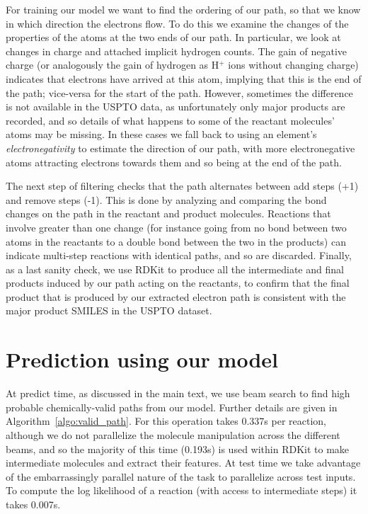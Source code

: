 For training our model we want to find the ordering of our path, so that we know in which direction the electrons flow.
To do this we examine the changes of the properties of the atoms at the two ends of our path. 
In particular, we look at changes in charge and attached implicit hydrogen counts. 
The gain of negative charge (or analogously the gain of hydrogen as H$^+$ ions without changing charge) indicates that electrons have arrived at this atom, 
implying that this is the end of the path; 
vice-versa for the start of the path.
However, sometimes the difference is not available in the USPTO data, as unfortunately only major products are recorded, and so details of what happens to some of the reactant molecules' atoms may be missing.
In these cases we fall back to using an element's {\em electronegativity} to estimate the direction of our path, with more electronegative atoms attracting electrons towards them and so being at the end of the path. 

The next step of filtering checks that the path alternates between add steps (+1) and remove steps (-1). 
This is done by analyzing and comparing the bond changes on the path in the reactant and product molecules. 
Reactions that involve greater than one change (for instance going from no bond between two atoms in the reactants to a double bond between the two in the products) can indicate multi-step 
reactions with identical paths, and so are discarded.
Finally, as a last sanity check, we use RDKit to produce all the intermediate and final products induced by our path acting on the reactants,
to confirm that the final product that is produced by our extracted electron path is consistent with the major product SMILES in the USPTO dataset.

\section{Prediction using our model}

At predict time, as discussed in the main text, we use beam search to find high probable chemically-valid paths from our model. Further details are given in Algorithm~\ref{algo:valid_path}. 
For \ourModel this operation takes 0.337s per reaction, although we do not parallelize the molecule manipulation across the different beams, and so the majority of this time (0.193s) is used within RDKit to make intermediate molecules and extract their features.
At test time we take advantage of the embarrassingly parallel nature of the task to parallelize across test inputs. 
To compute the log likelihood of a reaction (with access to intermediate steps) it takes \ourModel 0.007s.

